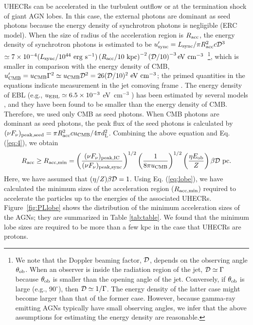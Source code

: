 \documentclass{aastex6}
\begin{document}
UHECRs can be accelerated in the turbulent outflow or at the termination shock of giant AGN lobes. 
In this case, the external photons are dominant as seed photons because the energy density of synchrotron photons is negligible (ERC model).
When the size of radius of the acceleration region is $R_{\rm{acc}}$, the energy density of synchrotron photons is estimated to be $u'_{\rm{sync}} = L_{\rm{sync}}/\pi R_{\rm{acc}}^{2}c\cal{D}\rm{}^{3}$$\simeq7\times10^{-4}(L_{\rm{sync}}/10^{44}~\rm{erg~s^{-1}})\left(\it{R_{\rm{acc}}}\rm{}/10~\rm{kpc}\right)^{-2}\left(\cal{D}\rm{}/10\right)^{-3} \rm{eV~cm^{-3}}$~\footnote{We note that the Doppler beaming factor, $\cal{D}\rm{}$, depends on the observing angle $\theta_{\rm{ob}}$.
When an observer is inside the radiation region of the jet, $\cal{D}\rm{}\simeq\Gamma$ because $\theta_{\rm{ob}}$ is smaller than the opening angle of the jet. 
Conversely, if $\theta_{\rm{ob}}$ is large (e.g., 90$^{\circ}$), then $\cal{D}\rm{}\simeq1/\Gamma$.
The energy density of the latter case might become larger than that of the former case. However, because gamma-ray emitting AGNs typically have small observing angles, we infer that the above assumptions for estimating the energy density are reasonable.}, which is smaller in comparison with the energy density of CMB, $u'_{\rm{CMB}} = u_{\rm{CMB}}\Gamma^{2} \simeq u_{\rm{CMB}}\cal{D}\rm{}^{2} = 26(\cal{D}\rm{}/10)^{2}~eV~cm^{-3}$; the primed quantities in the equations indicate measurement in the jet comoving frame \citep{Stawars}.
The energy density of EBL (e.g., $u_{\rm{EBL}}\simeq 6.5\times10^{-3}$ eV~cm$^{-3}$ \citep{EBL}) has been estimated by several models \citep[e.g.,][]{EBLmodel1, EBLmodel2, EBLmodel3}, and they have been found to be smaller than the energy density of CMB.
Therefore, we used only CMB as seed photons.
When CMB photons are dominant as seed photons, the peak flux of the seed photons is calculated by $(\nu F_{\nu})_{\rm{peak,seed}} = \pi R_{\rm{acc}}^{2}cu_{\rm{CMB}}/4\pi d^{2}_{\rm{L}}$.
Combining the above equation and Eq. (\ref{eq:4}), we obtain
\begin{equation}
R_{\rm acc} \geq R_{\rm{acc,min}} = \left(\frac{(\nu F_{\nu})_{\rm{\rm peak, IC}}}{(\nu F_{\nu})_{\rm peak, sync}}\right)^{1/2}\left(\frac{1}{8\pi u_{\rm CMB}}\right)^{1/2}\left(\frac{\eta E_{\rm ob}}{Z}\right)\beta\cal{D}~\rm{pc}.
\label{eq:lobe}
\end{equation}
Here, we have assumed that $(\eta/{\it Z})\beta \cal{D}\rm{} = 1$.
Using Eq. (\ref{eq:lobe}), we have calculated the minimum sizes of the acceleration region ($R_{\rm{acc,min}}$) required to accelerate the particles up to the energies of the associated UHECRs.
Figure~\ref{fig:PLlobe} shows the distribution of the minimum acceleration sizes of the AGNs; they are summarized in Table \ref{tab:table}.
We found that the minimum lobe sizes are required to be more than a few kpc in the case that UHECRs are protons.
\end{document}
